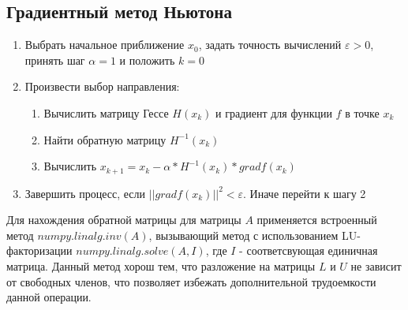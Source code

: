 \documentclass[../body.tex]{subfiles}
\begin{document}
\subsection{Градиентный метод Ньютона}	
\begin{enumerate}
    \item Выбрать начальное приближение $x_0$, задать точность вычислений $\varepsilon>0$, принять шаг $\alpha=1$ и положить $k=0$
    \item Произвести выбор направления:
        \begin{enumerate}
            \item Вычислить матрицу Гессе $H(x_k)$ и градиент для функции $f$ в точке $x_k$
            \item Найти обратную матрицу $H^{-1}(x_k)$
            \item Вычислить $x_{k+1}=x_k-\alpha *H^{-1}(x_k)*grad f(x_k)$
        \end{enumerate}
    \item Завершить процесс, если ${||grad f(x_k)||}^2<\varepsilon$. Иначе перейти к шагу 2
\end{enumerate}

Для нахождения обратной матрицы для матрицы $A$ применяется встроенный метод $numpy.linalg.inv(A)$, вызывающий метод с использованием LU-факторизации $numpy.linalg.solve(A,I)$, где $I$ - соответсвующая единичная матрица. Данный метод хорош тем, что разложение на матрицы $L$ и $U$ не зависит от свободных членов, что позволяет избежать дополнительной трудоемкости данной операции.
\end{document}
